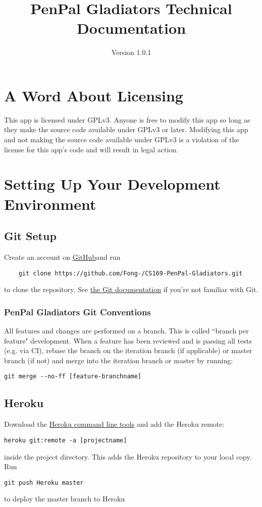 \documentclass[12pt]{article}
\title{PenPal Gladiators Technical Documentation}
\author{Version 1.0.1}
\begin{document}
\maketitle
\tableofcontents

\section{A Word About Licensing}
This app is licensed under GPLv3.  Anyone is free to modify this app so long as
they make the source code available under GPLv3 or later.  Modifying this app
and not making the source code available under GPLv3 is a violation of the
license for this app’s code and will result in legal action.

\section{Setting Up Your Development Environment}
\subsection{Git Setup}
Create an account on \href{https://github.com}{GitHub}and run
\begin{verbatim}
    git clone https://github.com/Fong-/CS169-PenPal-Gladiators.git
\end{verbatim}
to clone the repository.  See \href{https://git-scm.herokuapp.com/docs}{the
Git documentation} if you're not familiar with Git.


\subsubsection{PenPal Gladiators Git Conventions}
All features and changes are performed on a branch.  This is called ``branch per
feature" development.  When a feature has been reviewed and is passing all tests
(e.g. via CI), rebase the branch on the iteration branch (if applicable) or
master branch (if not) and merge into the iteration branch or master by running:
\begin{verbatim}
git merge --no-ff [feature-branchname]
\end{verbatim}

\subsection{Heroku}
Download the \href{https://heroku.com}{Heroku command line tools} and add the Heroku remote:
\begin{verbatim}
heroku git:remote -a [projectname]
\end{verbatim}
inside the project directory. This adds the Heroku repository to your local
copy. Run
\begin{verbatim}
git push Heroku master
\end{verbatim}
to deploy the master branch to Heroku
\end{document}
